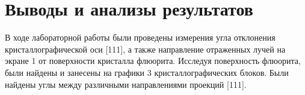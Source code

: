 \section{Выводы и анализы результатов}\label{sec:conclution}

В ходе лабораторной работы были проведены измерения угла отклонения кристаллографической оси [111], а также направление отраженных лучей на экране 1
от поверхности кристалла флюорита.
Исследуя поверхность флюорита, были найдены и занесены на графики 3 кристаллографических блоков.
Были найдены углы между различными направлениями проекций [111].

